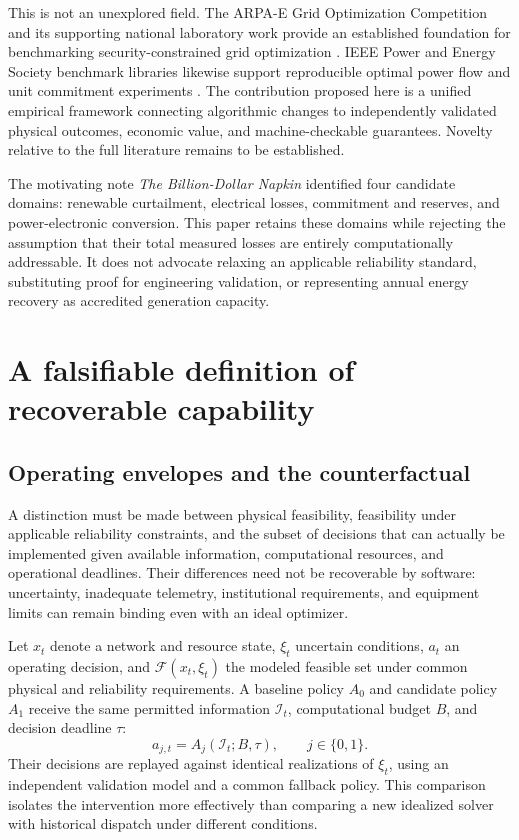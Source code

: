 \documentclass[11pt,letterpaper]{article}
\begin{document}
This is not an unexplored field. The ARPA-E Grid Optimization Competition and its supporting national laboratory work provide an established foundation for benchmarking security-constrained grid optimization \cite{go}. IEEE Power and Energy Society benchmark libraries likewise support reproducible optimal power flow and unit commitment experiments \cite{pglibopf,pglibuc}. The contribution proposed here is a unified empirical framework connecting algorithmic changes to independently validated physical outcomes, economic value, and machine-checkable guarantees. Novelty relative to the full literature remains to be established.

The motivating note \emph{The Billion-Dollar Napkin} \cite{napkin} identified four candidate domains: renewable curtailment, electrical losses, commitment and reserves, and power-electronic conversion. This paper retains these domains while rejecting the assumption that their total measured losses are entirely computationally addressable. It does not advocate relaxing an applicable reliability standard, substituting proof for engineering validation, or representing annual energy recovery as accredited generation capacity.

\section{A falsifiable definition of recoverable capability}
\subsection{Operating envelopes and the counterfactual}
A distinction must be made between physical feasibility, feasibility under applicable reliability constraints, and the subset of decisions that can actually be implemented given available information, computational resources, and operational deadlines. Their differences need not be recoverable by software: uncertainty, inadequate telemetry, institutional requirements, and equipment limits can remain binding even with an ideal optimizer.

Let $x_t$ denote a network and resource state, $\xi_t$ uncertain conditions, $a_t$ an operating decision, and $\mathcal{F}(x_t,\xi_t)$ the modeled feasible set under common physical and reliability requirements. A baseline policy $A_0$ and candidate policy $A_1$ receive the same permitted information $\mathcal{I}_t$, computational budget $B$, and decision deadline $\tau$:
\begin{equation}
a_{j,t}=A_j(\mathcal{I}_t;B,\tau),\qquad j\in\{0,1\}.
\label{eq:policy}
\end{equation}
Their decisions are replayed against identical realizations of $\xi_t$, using an independent validation model and a common fallback policy. This comparison isolates the intervention more effectively than comparing a new idealized solver with historical dispatch under different conditions.
\end{document}
